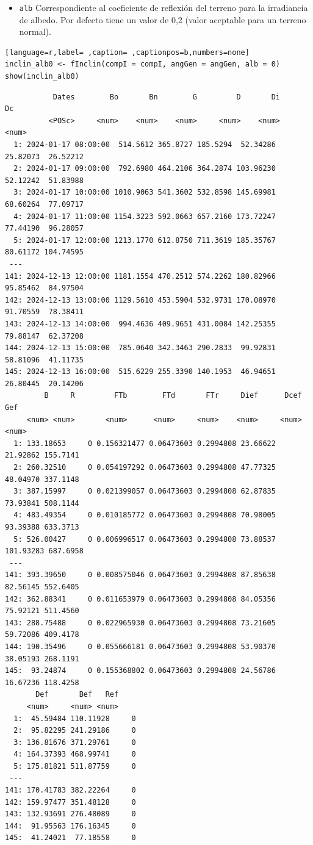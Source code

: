 \begin{itemize}
\begin{itemize}
\item \texttt{alb} Correspondiente al coeficiente de reflexión del terreno para la irradiancia de albedo. Por defecto tiene un valor de 0,2 (valor aceptable para un terreno normal).
\end{itemize}
\begin{lstlisting}[language=r,label= ,caption= ,captionpos=b,numbers=none]
inclin_alb0 <- fInclin(compI = compI, angGen = angGen, alb = 0)
show(inclin_alb0)
\end{lstlisting}

\begin{verbatim}
		   Dates        Bo       Bn        G         D       Di        Dc
		  <POSc>     <num>    <num>    <num>     <num>    <num>     <num>
  1: 2024-01-17 08:00:00  514.5612 365.8727 185.5294  52.34286 25.82073  26.52212
  2: 2024-01-17 09:00:00  792.6980 464.2106 364.2874 103.96230 52.12242  51.83988
  3: 2024-01-17 10:00:00 1010.9063 541.3602 532.8598 145.69981 68.60264  77.09717
  4: 2024-01-17 11:00:00 1154.3223 592.0663 657.2160 173.72247 77.44190  96.28057
  5: 2024-01-17 12:00:00 1213.1770 612.8750 711.3619 185.35767 80.61172 104.74595
 ---                                                                             
141: 2024-12-13 12:00:00 1181.1554 470.2512 574.2262 180.82966 95.85462  84.97504
142: 2024-12-13 13:00:00 1129.5610 453.5904 532.9731 170.08970 91.70559  78.38411
143: 2024-12-13 14:00:00  994.4636 409.9651 431.0084 142.25355 79.88147  62.37208
144: 2024-12-13 15:00:00  785.0640 342.3463 290.2833  99.92831 58.81096  41.11735
145: 2024-12-13 16:00:00  515.6229 255.3390 140.1953  46.94651 26.80445  20.14206
	     B     R         FTb        FTd       FTr     Dief      Dcef      Gef
	 <num> <num>       <num>      <num>     <num>    <num>     <num>    <num>
  1: 133.18653     0 0.156321477 0.06473603 0.2994808 23.66622  21.92862 155.7141
  2: 260.32510     0 0.054197292 0.06473603 0.2994808 47.77325  48.04970 337.1148
  3: 387.15997     0 0.021399057 0.06473603 0.2994808 62.87835  73.93841 508.1144
  4: 483.49354     0 0.010185772 0.06473603 0.2994808 70.98005  93.39388 633.3713
  5: 526.00427     0 0.006996517 0.06473603 0.2994808 73.88537 101.93283 687.6958
 ---                                                                             
141: 393.39650     0 0.008575046 0.06473603 0.2994808 87.85638  82.56145 552.6405
142: 362.88341     0 0.011653979 0.06473603 0.2994808 84.05356  75.92121 511.4560
143: 288.75488     0 0.022965930 0.06473603 0.2994808 73.21605  59.72086 409.4178
144: 190.35496     0 0.055666181 0.06473603 0.2994808 53.90370  38.05193 268.1191
145:  93.24874     0 0.155368802 0.06473603 0.2994808 24.56786  16.67236 118.4258
	   Def       Bef   Ref
	 <num>     <num> <num>
  1:  45.59484 110.11928     0
  2:  95.82295 241.29186     0
  3: 136.81676 371.29761     0
  4: 164.37393 468.99741     0
  5: 175.81821 511.87759     0
 ---                          
141: 170.41783 382.22264     0
142: 159.97477 351.48128     0
143: 132.93691 276.48089     0
144:  91.95563 176.16345     0
145:  41.24021  77.18558     0
\end{verbatim}


\end{itemize}
